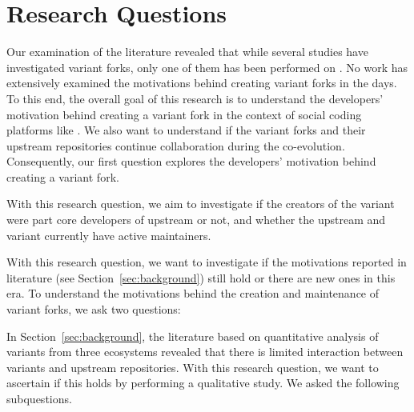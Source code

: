 \section{Research Questions}
\label{sec:rqs}

Our examination of the literature revealed that while several
studies have investigated variant forks, only one of them has been performed on \gh.
No work has extensively examined the motivations behind creating variant forks in the \gh days.
To this end, the overall goal of this research is to understand the developers' motivation behind creating a variant fork in the context of social coding platforms like \gh. We also want to understand if the variant forks and their upstream repositories continue collaboration during the co-evolution. 
Consequently, our first question explores the developers' motivation behind creating a variant fork.

\nd  \textbf{\rqOne} With this research question, we aim to investigate if the creators of the variant were part core developers of upstream or not, and whether the upstream and variant currently have active maintainers.

\nd  \emph{\rqOneOne}

\nd \emph{\rqOneTwo}

\nd \textbf{\rqTwo} With this research question, we want to investigate if the motivations reported in literature (see Section~\ref{sec:background}) still hold or there are new ones in this \gh era.
To understand the motivations behind the creation and maintenance of variant forks, we ask two questions:

\nd \textit{\rqTwoOne} 

\nd  \textit{\rqTwoTwo} 

\nd  \textit{\rqTwoThree}

\nd \textbf{\rqThree} In Section~\ref{sec:background}, the literature based on quantitative analysis of variants from three ecosystems revealed that there is limited interaction between variants and upstream repositories. With this research question, we want to ascertain if this holds by performing a qualitative study. We asked the following subquestions.

\nd \textit{\rqThreeOne}

\nd \textit{\rqThreeTwo}

